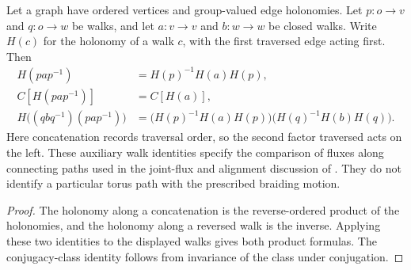 \begin{lemma}%
    \label{thm:peps_regular_connector_holonomy}
    \leanok
    Let a graph have ordered vertices and group-valued edge holonomies.
    Let $p:o\to v$ and $q:o\to w$ be walks, and let $a:v\to v$
    and $b:w\to w$ be closed walks. Write $H(c)$ for the holonomy of
    a walk $c$, with the first traversed edge acting first. Then
    \begin{align}
        H(pap^{-1})    & = H(p)^{-1}H(a)H(p),            \\
        C[H(pap^{-1})] & = C[H(a)],                      \\
        H\bigl((qbq^{-1})(pap^{-1})\bigr)
                       & = \bigl(H(p)^{-1}H(a)H(p)\bigr)
        \bigl(H(q)^{-1}H(b)H(q)\bigr).
    \end{align}
    Here concatenation records traversal order, so the second factor
    traversed acts on the left. These auxiliary walk identities specify
    the comparison of fluxes along connecting paths used in the joint-flux
    and alignment discussion of \cite[\S6.6]{Schuch2010PEPS}. They do not
    identify a particular torus path with the prescribed braiding motion.
\end{lemma}

\begin{proof}\leanok
    The holonomy along a concatenation is the reverse-ordered product of the
    holonomies, and the holonomy along a reversed walk is the inverse.
    Applying these two identities to the displayed walks gives both
    product formulas. The conjugacy-class identity follows from invariance
    of the class under conjugation.
\end{proof}
